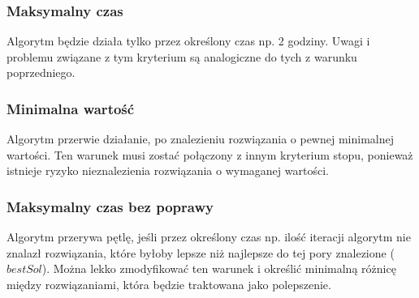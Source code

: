 \subsubsection{Maksymalny czas} 
Algorytm będzie działa tylko przez określony czas
np. 2 godziny. Uwagi i problemu związane z tym kryterium są analogiczne do tych
z warunku poprzedniego.

\subsubsection{Minimalna wartość} 
Algorytm przerwie działanie, po znalezieniu rozwiązania o pewnej minimalnej
wartości. Ten warunek musi zostać połączony z innym kryterium stopu, ponieważ
istnieje ryzyko nieznalezienia rozwiązania o wymaganej wartości.

\subsubsection{Maksymalny czas bez poprawy} 
Algorytm przerywa pętlę, jeśli przez określony czas np. ilość iteracji algorytm
nie znalazł rozwiązania, które byłoby lepsze niż najlepsze do tej pory
znalezione ($bestSol$). Można lekko zmodyfikować ten warunek i określić minimalną
różnicę między rozwiązaniami, która będzie traktowana jako polepszenie. 

